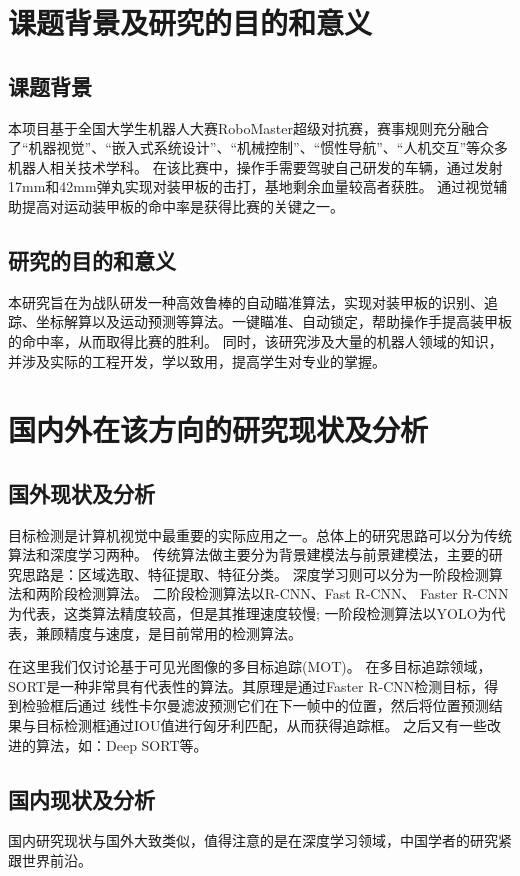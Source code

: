 \section{课题背景及研究的目的和意义}
\subsection{课题背景}
本项目基于全国大学生机器人大赛RoboMaster超级对抗赛，赛事规则充分融合了“机器视觉”、“嵌入式系统设计”、“机械控制”、“惯性导航”、“人机交互”等众多机器人相关技术学科。
在该比赛中，操作手需要驾驶自己研发的车辆，通过发射17mm和42mm弹丸实现对装甲板的击打，基地剩余血量较高者获胜。
通过视觉辅助提高对运动装甲板的命中率是获得比赛的关键之一。

\subsection{研究的目的和意义}
本研究旨在为战队研发一种高效鲁棒的自动瞄准算法，实现对装甲板的识别、追踪、坐标解算以及运动预测等算法。一键瞄准、自动锁定，帮助操作手提高装甲板的命中率，从而取得比赛的胜利。
同时，该研究涉及大量的机器人领域的知识，并涉及实际的工程开发，学以致用，提高学生对专业的掌握。
\section{国内外在该方向的研究现状及分析}
\subsection{国外现状及分析}
目标检测是计算机视觉中最重要的实际应用之一。总体上的研究思路可以分为传统算法和深度学习两种。
传统算法做主要分为背景建模法与前景建模法，主要的研究思路是：区域选取、特征提取、特征分类。
深度学习则可以分为一阶段检测算法和两阶段检测算法。
二阶段检测算法以R-CNN、Fast R-CNN、 Faster R-CNN为代表，这类算法精度较高，但是其推理速度较慢;
一阶段检测算法以YOLO为代表，兼顾精度与速度，是目前常用的检测算法。 \par

在这里我们仅讨论基于可见光图像的多目标追踪(MOT)。
在多目标追踪领域，SORT是一种非常具有代表性的算法。其原理是通过Faster R-CNN检测目标，得到检验框后通过
线性卡尔曼滤波预测它们在下一帧中的位置，然后将位置预测结果与目标检测框通过IOU值进行匈牙利匹配，从而获得追踪框。
之后又有一些改进的算法，如：Deep SORT等。



\subsection{国内现状及分析}
国内研究现状与国外大致类似，值得注意的是在深度学习领域，中国学者的研究紧跟世界前沿。
